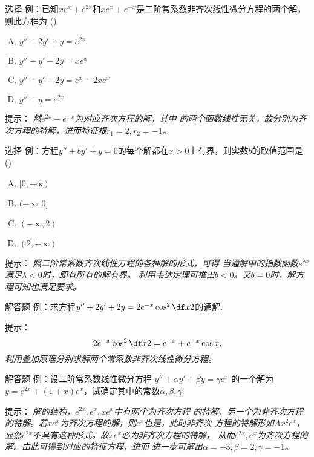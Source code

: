\begin{frame}{选择}
	\linespread{1.3}
	\alert{例：}已知$xe^x+e^{2x}$和$xe^x+e^{-x}$是二阶常系数非齐次线性微分方程的两个解，
	则此方程为
	(\underline{\;})
	\begin{enumerate}[(A)]
	  \item $y''-2y'+y=e^{2x}$
	  \item $y''-y'-2y=xe^{x}$
	  \item $y''-y'-2y=e^x-2xe^{x}$
	  \item $y''-y=e^{2x}$
	\end{enumerate}
	\pause\alert{提示：}\it\b 显然$e^{2x}-e^{-x}$为对应齐次方程的解，其中
	的两个函数线性无关，故分别为齐次方程的特解，进而特征根$r_1=2,r_2=-1$。
\end{frame}

\begin{frame}{选择}
	\linespread{1.3}
	\alert{例：}方程$y''+by'+y=0$的每个解都在$x>0$上有界，则实数$b$的取值范围是
	(\underline{\;})
	\begin{enumerate}[(A)]
	  \item $[0,+\infty)$
	  \item $(-\infty,0]$
	  \item $(-\infty,2)$
	  \item $(2,+\infty)$
	\end{enumerate}
	\pause\alert{提示：}\it\b 对照二阶常系数齐次线性方程的各种解的形式，可得
	当通解中的指数函数$e^{\lambda x}$满足$\lambda<0$时，即有所有的解有界。
	利用韦达定理可推出$b<0$。又$b=0$时，解方程可知也满足要求。
\end{frame}

\begin{frame}{解答题}
	\linespread{1.2}
	\alert{例：}求方程$y''+2y'+2y=2e^{-x}\cos^2\df x2$的通解.
	
	\pause\alert{提示：}\it\b 
	$$2e^{-x}\cos^2\df x2=e^{-x}+e^{-x}\cos x,$$
	利用叠加原理分别求解两个常系数非齐次线性微分方程。
\end{frame}

\begin{frame}{解答题}
	\linespread{1.5}
	\alert{例：}设二阶常系数线性微分方程
	$y''+\alpha y'+\beta y=\gamma e^x$
	的一个解为$y=e^{2x}+(1+x)e^x$，试确定其中的常数$\alpha,\beta,\gamma$.
	
	\pause\alert{提示：}\it\b 由解的结构，$e^{2x},e^x,xe^x$中有两个为齐次方程
	的特解，另一个为非齐次方程的特解。若$xe^x$为齐次方程的解，则$e^x$也是，此时非齐次
	方程的特解形如$Ax^2e^x$，显然$e^{2x}$不具有这种形式。故$xe^x$必为非齐次方程的特解，
	从而$e^{2x},e^x$为齐次方程的解。由此可得到对应的特征方程，进而
	进一步可解出$\alpha=-3,\beta=2,\gamma=-1$。
\end{frame}


